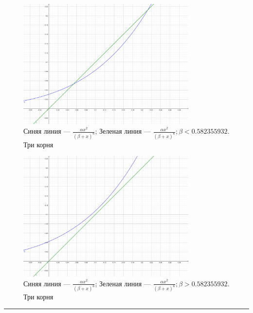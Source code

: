         \begin{figure}[h!]
            \centering
            \includegraphics[width=0.8\textwidth]{images/main_intersect.jpg}

            \caption{Синяя линия --- \(\frac{\alpha x^2}{(\beta + x)^6}\); Зеленая линия --- \(\frac{\alpha x^2}{(\beta + x)^6}; \beta < 0.582355932\). Три корня}
            \label{mainIntersect}
        \end{figure}

        \begin{figure}[h!]
            \centering
            \includegraphics[width=0.8\textwidth]{images/main_over.jpg}

            \caption{Синяя линия --- \(\frac{\alpha x^2}{(\beta + x)^6}\); Зеленая линия --- \(\frac{\alpha x^2}{(\beta + x)^6}; \beta > 0.582355932\). Три корня}
            \label{mainOver}
        \end{figure}

        \par\noindent\rule{\textwidth}{0.4pt}

